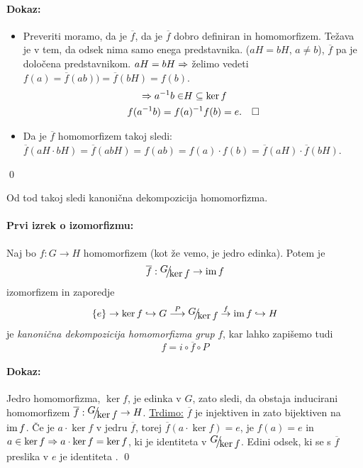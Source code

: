 \paragraph{Dokaz:}
\begin{itemize}
	\item{Preveriti moramo, da je $\overline{f}$, da je $\overline{f}$ dobro definiran in homomorfizem. Te\v zava
	je v tem, da odsek nima samo enega predstavnika. ($aH = bH$, $a \neq b$), $\overline{f}$ pa je dolo\v cena 
	predstavnikom. $aH = bH \Rightarrow$ \v zelimo vedeti $f(a) = \overline{f}(ab) ) = \overline{f}(bH) = f (b)$.
	\begin{align*}
		\Rightarrow a^{-1}b \in &H \subseteq \ker f \\
		f(a^{-1}b) = f(&a)^{-1} f(b) = e. \quad \square
	\end{align*}}
	\item{Da je $\overline{f}$ homomorfizem takoj sledi: $\overline{f}(aH \cdot bH) = \overline{f}(abH) = f(ab) = f(a)
		\cdot f(b) = \overline{f}(aH) \cdot \overline{f}(bH)$.}
\end{itemize}
\qed

\ni Od tod takoj sledi kanoni\v cna dekompozicija homomorfizma.
\begin{trditev}
	\paragraph{Prvi izrek o izomorfizmu:} Naj bo $f:G \to H$ homomorfizem (kot \v ze vemo, je jedro edinka). Potem je
	\[
		\overline{f}: \quot{G}{\ker f} \to \im f
	\] izomorfizem in zaporedje
	\[
		\{e\} \to \ker f \hookrightarrow G \stackrel{P}{\longrightarrow} \quot{G}{\ker f} \stackrel{f}{\to} \im f \hookrightarrow H
	\] je \emph{kanoni\v cna dekompozicija homomorfizma grup} $f$, kar lahko zapi\v semo tudi
	\[
		f = i \circ \overline{f} \circ P
	\]
\end{trditev}

\paragraph{Dokaz:} Jedro homomorfizma, $\ker f$, je edinka v $G$, zato sledi, da obstaja inducirani homomorfizem $\overline{f}: \quot{G}{\ker f} \to H$.
\underline{Trdimo:} $\overline{f}$ je injektiven in zato bijektiven na $\operatorname{im} f$. \v Ce je $a\cdot \ker f$ v jedru $\overline{f}$, torej
$\overline{f}(a\cdot \ker f) = e$, je $f(a) = e$ in $a \in \ker f \Rightarrow a\cdot \ker f = \ker f$, ki je identiteta v $\quot{G}{\ker f}$.
Edini odsek, ki se s $\overline{f}$ preslika v $e$ je identiteta .
\qed


